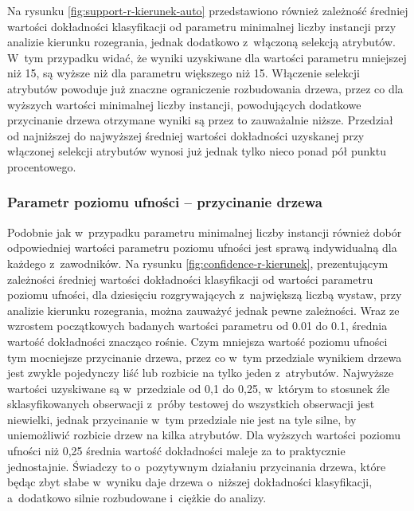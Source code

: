 \documentclass[a4paper,twoside,12pt]{book}
\begin{document}
Na rysunku \ref{fig:support-r-kierunek-auto} przedstawiono również zależność średniej wartości dokładności klasyfikacji od parametru minimalnej liczby instancji przy analizie kierunku rozegrania, jednak dodatkowo z~włączoną selekcją atrybutów. W~tym przypadku widać, że wyniki uzyskiwane dla wartości parametru mniejszej niż 15, są wyższe niż dla parametru większego niż 15. Włączenie selekcji atrybutów powoduje już znaczne ograniczenie rozbudowania drzewa, przez co dla wyższych wartości minimalnej liczby instancji, powodujących dodatkowe przycinanie drzewa otrzymane wyniki są przez to zauważalnie niższe. Przedział od najniższej do najwyższej średniej wartości dokładności uzyskanej przy włączonej selekcji atrybutów wynosi już jednak tylko nieco ponad pół punktu procentowego.

\subsubsection{Parametr poziomu ufności -- przycinanie drzewa}

Podobnie jak w~przypadku parametru minimalnej liczby instancji również dobór odpowiedniej wartości parametru poziomu ufności jest sprawą indywidualną dla każdego z~zawodników. Na rysunku \ref{fig:confidence-r-kierunek}, prezentującym zależności średniej wartości dokładności klasyfikacji od wartości parametru poziomu ufności, dla dziesięciu rozgrywających z~największą liczbą wystaw, przy analizie kierunku rozegrania, można zauważyć jednak pewne zależności. Wraz ze wzrostem początkowych badanych wartości parametru od 0.01 do 0.1, średnia wartość dokładności znacząco rośnie. Czym mniejsza wartość poziomu ufności tym mocniejsze przycinanie drzewa, przez co w~tym przedziale wynikiem drzewa jest zwykle pojedynczy liść lub rozbicie na tylko jeden z~atrybutów. Najwyższe wartości uzyskiwane są w~przedziale od 0,1 do 0,25, w~którym to stosunek źle sklasyfikowanych obserwacji z~próby testowej do wszystkich obserwacji jest niewielki, jednak przycinanie w~tym przedziale nie jest na tyle silne, by uniemożliwić rozbicie drzew na kilka atrybutów. Dla wyższych wartości poziomu ufności niż 0,25 średnia wartość dokładności maleje za to praktycznie jednostajnie. Świadczy to o~pozytywnym działaniu przycinania drzewa, które będąc zbyt słabe w~wyniku daje drzewa o~niższej dokładności klasyfikacji, a~dodatkowo silnie rozbudowane i~ciężkie do analizy.
\end{document}
